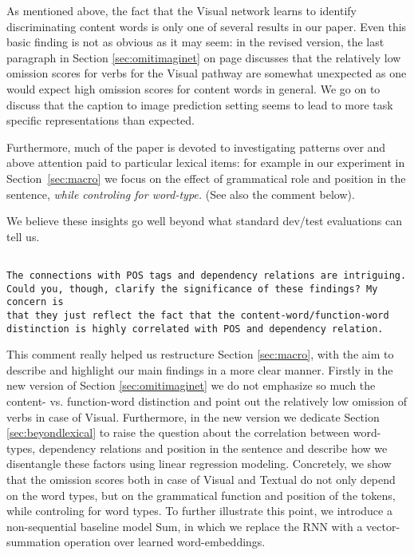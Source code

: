 \documentclass{article}
\begin{document}
As mentioned above, the fact that the {\sc Visual} network learns to
identify discriminating content words is only one of several results
in our paper. Even this basic finding is not as obvious as it
may seem: in the revised version, the last paragraph in Section \ref{sec:omitimaginet} on page 
\pageref{edit:generality} discusses that the relatively low omission scores
for verbs for the {\sc Visual} pathway are somewhat unexpected as one 
would expect high omission
scores for content words in general. We go on to discuss that the caption to
image prediction setting 
seems to lead to more task specific representations than expected. 

Furthermore, much of the paper is devoted to investigating patterns
over and above attention paid to particular lexical items: for
example in our experiment in Section~\ref{sec:macro} we focus on the
effect of grammatical role and position in the sentence, {\it while
  controling for word-type.} (See also the comment below).

We believe these insights go well beyond what standard dev/test evaluations
can tell us.


\begin{verbatim}

The connections with POS tags and dependency relations are intriguing.
Could you, though, clarify the significance of these findings? My concern is
that they just reflect the fact that the content-word/function-word
distinction is highly correlated with POS and dependency relation.
\end{verbatim}

This comment really helped us restructure Section \ref{sec:macro}, with the aim
to describe and highlight our main findings in a more clear manner. 
Firstly in the new version of Section \ref{sec:omitimaginet} we do not emphasize so much
the content- vs. function-word distinction and point out the relatively
low omission of verbs in case of {\sc Visual}. Furthermore, in the new version
we dedicate Section \ref{sec:beyondlexical} to raise the question about 
the correlation between word-types, dependency relations and position in the 
sentence and describe how we disentangle these factors using linear
regression modeling. Concretely, we show
that the omission scores both in case of {\sc Visual} and {\sc Textual} do not
only depend on the word types, but on the grammatical function 
and position of the tokens, while controling for word types.
To further illustrate this point, we introduce a non-sequential baseline model {\sc Sum}, 
in which we replace the RNN with a
vector-summation operation over learned word-embeddings. 
\end{document}
